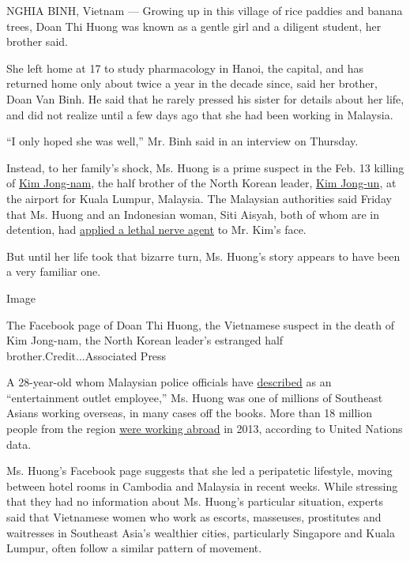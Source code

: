 NGHIA BINH, Vietnam --- Growing up in this village of rice paddies and
banana trees, Doan Thi Huong was known as a gentle girl and a diligent
student, her brother said.

She left home at 17 to study pharmacology in Hanoi, the capital, and has
returned home only about twice a year in the decade since, said her
brother, Doan Van Binh. He said that he rarely pressed his sister for
details about her life, and did not realize until a few days ago that
she had been working in Malaysia.

``I only hoped she was well,'' Mr. Binh said in an interview on
Thursday.

Instead, to her family's shock, Ms. Huong is a prime suspect in the Feb.
13 killing of
\href{https://www.nytimes.com/2017/02/15/world/asia/kim-jong-nam-assassination-north-korea.html}{Kim
Jong-nam}, the half brother of the North Korean leader,
\href{http://topics.nytimes.com/top/reference/timestopics/people/k/kim_jongun/index.html?inline=nyt-per}{Kim
Jong-un}, at the airport for Kuala Lumpur, Malaysia. The Malaysian
authorities said Friday that Ms. Huong and an Indonesian woman, Siti
Aisyah, both of whom are in detention, had
\href{https://www.nytimes.com/2017/02/23/world/asia/kim-jong-nam-vx-nerve-agent-.html}{applied
a lethal nerve agent} to Mr. Kim's face.

But until her life took that bizarre turn, Ms. Huong's story appears to
have been a very familiar one.

Image

The Facebook page of Doan Thi Huong, the Vietnamese suspect in the death
of Kim Jong-nam, the North Korean leader's estranged half
brother.Credit...Associated Press

A 28-year-old whom Malaysian police officials have
\href{http://www.nytimes.com/2017/02/22/world/asia/kim-jong-nam-assassination-korea-malaysia.html}{described}
as an ``entertainment outlet employee,'' Ms. Huong was one of millions
of Southeast Asians working overseas, in many cases off the books. More
than 18 million people from the region
\href{http://apmigration.ilo.org/resources/ilms-database-for-asean-international-migration-in-asean-at-a-glance}{were
working abroad} in 2013, according to United Nations data.

Ms. Huong's Facebook page suggests that she led a peripatetic lifestyle,
moving between hotel rooms in Cambodia and Malaysia in recent weeks.
While stressing that they had no information about Ms. Huong's
particular situation, experts said that Vietnamese women who work as
escorts, masseuses, prostitutes and waitresses in Southeast Asia's
wealthier cities, particularly Singapore and Kuala Lumpur, often follow
a similar pattern of movement.

